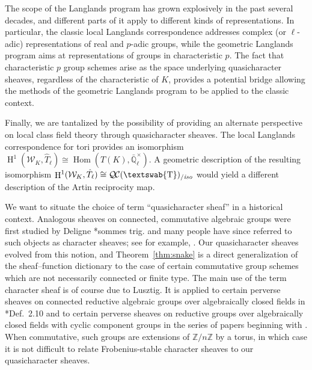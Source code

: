 \documentclass[11pt]{amsart}
\newcommand{\mathswab}[1]{\operatorname{\textswab{#1}}}
\theoremstyle{plain}
\theoremstyle{definition}
\theoremstyle{remark}
\newcommand{\ZZ}{{\mathbb{Z}}}
\newcommand{\EE}{\mathbb{\bar Q}_\ell}
\newcommand{\EEx}{\EE^\times}
\DeclareMathOperator{\Hom}{Hom}
\DeclareMathOperator{\Hh}{H}
\newcommand{\GN}[1]{\mathswab{#1}}
\newcommand{\QC}{{\mathcal{Q\hskip-0.8pt C}}}
\newcommand{\QCiso}[1]{\QC(#1)_{/\textit{iso}}}
\newcommand{\Weil}[1]{\mathcal{W}_{#1}}
\begin{document}
The scope of the Langlands program has grown explosively in the past several decades, and
different parts of it apply to different kinds of representations.  In particular, the classic local Langlands
correspondence addresses complex (or $\ell$-adic) representations of real and $p$-adic groups, while
the geometric Langlands program aims at representations of groups in characteristic $p$.  The fact that
characteristic $p$ group schemes arise as the space underlying quasicharacter sheaves, regardless of
the characteristic of $K$, provides a potential bridge allowing the methods of the geometric Langlands
program to be applied to the classic context. 

Finally, we are tantalized by the possibility of providing an alternate perspective on local class field theory
through quasicharacter sheaves.  The local Langlands correspondence for tori provides an isomorphism
$
\Hh^1(\Weil{K}, \hat{T}_\ell) \cong \Hom(T(K), \EEx)
$. 
A geometric description of the resulting isomorphism $\Hh^1(\Weil{K}, \hat{T}_\ell) \cong \QCiso{\GN{T}}$
would yield a different description of the Artin reciprocity map.

We want to situate the choice of term ``quasicharacter sheaf'' in a historical context.
Analogous sheaves on connected, commutative algebraic groups were first studied
by Deligne \cite{deligne:SGA4.5}*{sommes trig.} and many people have since referred to such objects
as character sheaves; see for example, \cite{kamgarpour:09a}. 
Our quasicharacter sheaves evolved from this notion, and Theorem~\ref{thm:snake}
is a direct generalization of the sheaf--function dictionary to the case of certain commutative
group schemes which are not necessarily connected or finite type.  The main use
of the term character sheaf is of course due to Lusztig. It is applied to certain perverse
sheaves on connected reductive algebraic groups over algebraically closed fields in
\cite{lusztig:85a}*{Def.~2.10} and to certain perverse sheaves on reductive groups
over algebraically closed fields with cyclic component groups in the series of papers
beginning with \cite{lusztig:disconnected1}.  
When commutative, such groups are extensions of $\ZZ/n\ZZ$ by a torus,
in which case it is not difficult to relate Frobenius-stable character sheaves to our quasicharacter sheaves.
\end{document}
